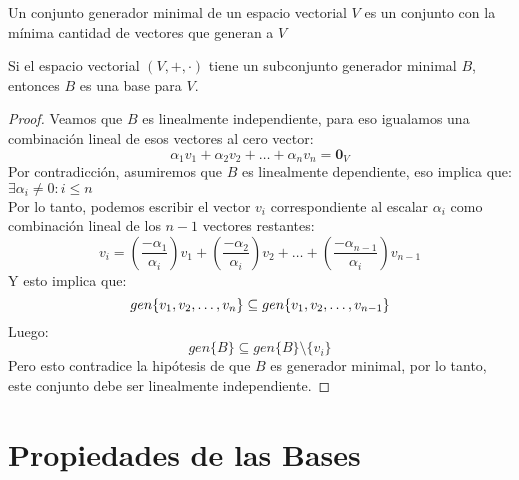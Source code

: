 \begin{obsimp}
Un conjunto generador minimal de un espacio vectorial $V$ es un conjunto con la mínima cantidad de vectores que generan a $V$
\end{obsimp}
\begin{theorem}
Si el espacio vectorial $(V , + , \cdot)$ tiene un subconjunto generador minimal $B$, entonces $B$ es una base para $V$.
\end{theorem}
\begin{proof}
Veamos que $B$ es linealmente independiente, para eso igualamos una combinación lineal de esos vectores al cero vector:
$$\alpha_1 v_1 + \alpha_2  v_2 + \hdots + \alpha_n v_n = \mathbf{0}_V $$
Por contradicción, asumiremos que $B$ es linealmente dependiente, eso implica que: $\exists \alpha_i \neq 0: i \leq n$\\
Por lo tanto, podemos escribir el vector $v_i$ correspondiente al escalar $\alpha_i$ como combinación lineal de los $n-1$ vectores restantes:
$$v_i = \left( \frac{-\alpha_1}{\alpha_i} \right)v_1 + \left( \frac{-\alpha_2}{\alpha_i} \right)v_2 + \hdots + \left( \frac{-\alpha_{n-1}}{\alpha_i} \right)v_{n-1}$$
Y esto implica que: 
$$gen \lbrace v_1, v_2, \ldots, v_n \rbrace \subseteq gen \lbrace v_1, v_2, \ldots, v_{n-1} \rbrace$$
Luego:
$$gen\{B\} \subseteq gen\{B\} \setminus \{v_i\}$$
Pero esto contradice la hipótesis de que $B$ es generador minimal, por lo tanto, este conjunto debe ser linealmente independiente.

\end{proof}


\section{Propiedades de las Bases}
%


